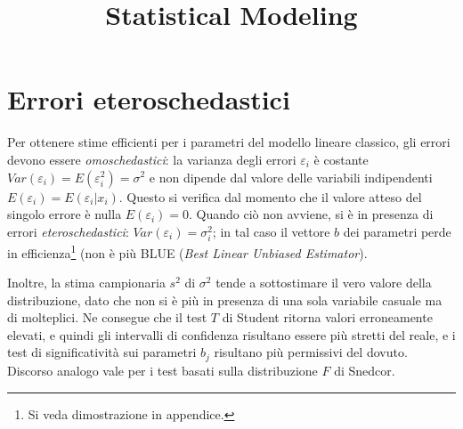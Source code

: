 \documentclass[a4page, 11pt]{article} %
\title{Statistical Modeling}
\author{}
\date{}
\begin{document}
\maketitle
\tableofcontents %
\newpage

\section{Errori eteroschedastici}
Per ottenere stime efficienti per i parametri del modello lineare classico, gli errori devono essere \textit{omoschedastici}: la varianza degli errori $\varepsilon_i$ è costante $Var(\varepsilon_i) = E(\varepsilon_i^2) = \sigma^2$ e non dipende dal valore delle variabili indipendenti $E(\varepsilon_i) = E(\varepsilon_i | x_i)$.
Questo si verifica dal momento che il valore atteso del singolo errore è nulla $E(\varepsilon_i) = 0$.
Quando ciò non avviene, si è in presenza di errori \textit{eteroschedastici}: $Var(\varepsilon_i) = \sigma_i^2$; in tal caso il vettore $b$ dei parametri perde in efficienza\footnote{Si veda dimostrazione in appendice.} (non è più BLUE (\textit{Best Linear Unbiased Estimator}).

Inoltre, la stima campionaria $s^2$ di $\sigma^2$ tende a sottostimare il vero valore della distribuzione, dato che non si è più in presenza di una sola variabile casuale ma di molteplici.
Ne consegue che il test $T$ di Student ritorna valori erroneamente elevati, e quindi gli intervalli di confidenza risultano essere più stretti del reale, e i test di significatività sui parametri $b_j$ risultano più permissivi del dovuto.
Discorso analogo vale per i test basati sulla distribuzione $F$ di Snedcor.
\end{document}
